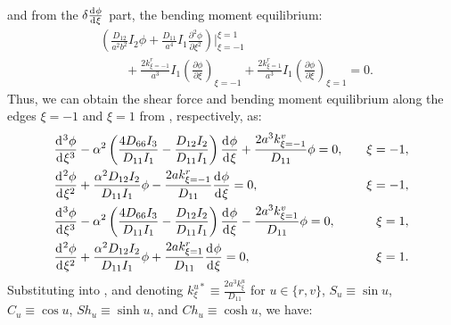 \documentclass[preprint,12pt]{elsarticle}
\newcommand{\id}{\mathrm{d}\mkern1mu}
\begin{document}
%
and from the $\delta \frac{\id \phi}{\id \xi}$ part, the bending moment equilibrium:
%
\begin{equation}\label{eq:inertial_forcex2}
	\begin{split}	
		&\left( \frac{D_{12}}{a^2b^2} I_2 \phi + \frac{D_{11}}{a^4} I_1 \frac{\partial^2 \phi}{\partial \xi^2} \right) 
		\Big|^{\xi=1}_{\xi=-1} \\
		&\qquad + \frac{2k^r_{\xi=-1}}{a^3} I_1 \left(\frac{\partial \phi}{\partial \xi}\right)_{\xi=-1}
		+ \frac{2k^r_{\xi=1}}{a^3} I_1 \left(\frac{\partial \phi}{\partial \xi}\right)_{\xi=1} = 0.
	\end{split}
\end{equation}
%
Thus, we can obtain the shear force and bending moment equilibrium along the edges $\xi = -1$ and $\xi = 1$ from , respectively, as:
%
\begin{subequations}\label{eq:boundaryx}
	\begin{align}
		&  \frac{\id^3 \phi}{\id \xi^3} - \alpha^2\left( \frac{4D_{66}I_3}{D_{11}I_1}  - \frac{D_{12}I_2}{D_{11}I_1}  \right) \frac{\id \phi}{\id \xi} 
		+\frac{2a^3k^v_{\xi=-1}}{D_{11}}\phi = 0, \quad &\xi = -1, \\
		& \frac{\id^2 \phi}{\id \xi^2} + \frac{\alpha^2 D_{12} I_2}{D_{11} I_1} \phi - \frac{2a k^r_{\xi=-1}}{D_{11}} \frac{\id \phi}{\id \xi} = 0, \quad &\xi = -1, \\
		& \frac{\id^3 \phi}{\id \xi^3} - \alpha^2\left( \frac{4D_{66}I_3}{D_{11}I_1}  - \frac{D_{12}I_2}{D_{11}I_1}  \right) \frac{\id \phi}{\id \xi} 
		-\frac{2a^3 k^v_{\xi=1}}{D_{11}} \phi = 0, \quad &\xi = 1, \\
		& \frac{\id^2 \phi}{\id \xi^2} + \frac{\alpha^2 D_{12} I_2}{D_{11} I_1} \phi + \frac{2a k^r_{\xi=1}}{D_{11}} \frac{\id \phi}{\id \xi} = 0, \quad &\xi = 1.
	\end{align}
\end{subequations}
%
Substituting  into , and denoting $ k^{u*}_{\xi} \equiv \frac{2a^3 k^u_{\xi}}{D_{11}} $ for $u \in \{r,v\}$, $ S_u \equiv \sin u $, $ C_u \equiv \cos u $, $ Sh_u \equiv \sinh u$, and $ Ch_u \equiv \cosh u $, we have:
%
\end{document}
